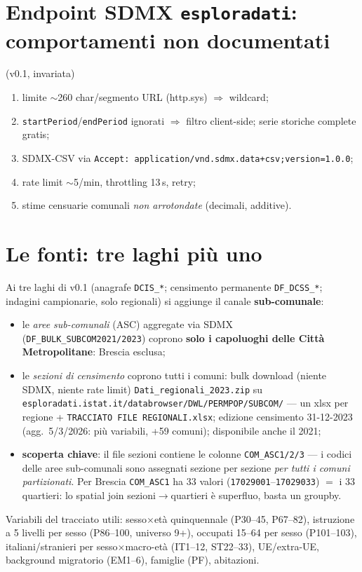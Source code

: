 \documentclass[11pt,a4paper]{article}
\newcommand{\code}[1]{\texttt{#1}}
\newcommand{\flow}[1]{\texttt{\small #1}}
\begin{document}
\section{Endpoint SDMX \code{esploradati}: comportamenti non documentati}
\label{sec:quirks}
(v0.1, invariata) \begin{enumerate}[leftmargin=*,itemsep=1pt]
  \item limite $\sim$260 char/segmento URL (http.sys) $\Rightarrow$ wildcard;
  \item \code{startPeriod}/\code{endPeriod} ignorati $\Rightarrow$ filtro
  client-side; serie storiche complete gratis;
  \item SDMX-CSV via \code{Accept: application/vnd.sdmx.data+csv;version=1.0.0};
  \item rate limit $\sim$5/min, throttling 13\,s, retry;
  \item stime censuarie comunali \emph{non arrotondate} (decimali, additive).
\end{enumerate}

\section{Le fonti: tre laghi pi\`u uno}
\label{sec:laghi}
Ai tre laghi di v0.1 (anagrafe \flow{DCIS\_*}; censimento permanente
\flow{DF\_DCSS\_*}; indagini campionarie, solo regionali) si aggiunge il
canale \textbf{sub-comunale}:
\begin{itemize}[leftmargin=*,itemsep=1pt]
  \item le \emph{aree sub-comunali} (ASC) aggregate via SDMX
  (\flow{DF\_BULK\_SUBCOM2021/2023}) coprono \textbf{solo i capoluoghi delle
  Citt\`a Metropolitane}: Brescia esclusa;
  \item le \emph{sezioni di censimento} coprono tutti i comuni: bulk download
  (niente SDMX, niente rate limit)
  \code{Dati\_regionali\_2023.zip} su
  \code{esploradati.istat.it/databrowser/DWL/PERMPOP/SUBCOM/} --- un xlsx per
  regione + \code{TRACCIATO FILE REGIONALI.xlsx}; edizione censimento
  31-12-2023 (agg.\ 5/3/2026: pi\`u variabili, +59 comuni); disponibile anche
  il 2021;
  \item \textbf{scoperta chiave}: il file sezioni contiene le colonne
  \code{COM\_ASC1/2/3} --- i codici delle aree sub-comunali sono assegnati
  sezione per sezione \emph{per tutti i comuni partizionati}. Per Brescia
  \code{COM\_ASC1} ha 33 valori (\code{17029001}--\code{17029033}) $=$ i 33
  quartieri: lo spatial join sezioni$\to$quartieri \`e superfluo, basta un
  groupby.
\end{itemize}
Variabili del tracciato utili: sesso$\times$et\`a quinquennale (P30--45,
P67--82), istruzione a 5 livelli per sesso (P86--100, universo 9+), occupati
15--64 per sesso (P101--103), italiani/stranieri per sesso$\times$macro-et\`a
(IT1--12, ST22--33), UE/extra-UE, background migratorio (EM1--6), famiglie
(PF), abitazioni.
\end{document}
